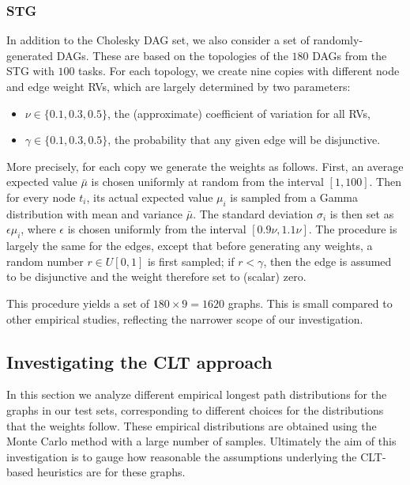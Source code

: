 \documentclass[12pt]{article}
\begin{document}
\subsubsection{STG}
\label{subsubsect.stg}

In addition to the Cholesky DAG set, we also consider a set of randomly-generated DAGs. These are based on the topologies of the $180$ DAGs from the STG with $100$ tasks. For each topology, we create nine copies with different node and edge weight RVs, which are largely determined by two parameters:
\begin{itemize}
\item $\nu \in \{ 0.1, 0.3, 0.5 \}$, the (approximate) coefficient of variation for all RVs,
  \item $\gamma \in \{ 0.1, 0.3, 0.5 \}$, the probability that any given edge will be disjunctive.
  \end{itemize}
  More precisely, for each copy we generate the weights as follows. First, an average expected value $\bar{\mu}$ is chosen uniformly at random from the interval $[1, 100]$. Then for every node $t_i$, its actual expected value $\mu_i$ is sampled from a Gamma distribution with mean and variance $\bar{\mu}$. The standard deviation $\sigma_i$ is then set as $\epsilon \mu_i$, where $\epsilon$ is chosen uniformly from the interval $[0.9\nu, 1.1\nu]$. The procedure is largely the same for the edges, except that before generating any weights, a random number $r \in U[0, 1]$ is first sampled; if $r < \gamma$, then the edge is assumed to be disjunctive and the weight therefore set to (scalar) zero.

  This procedure yields a set of $180 \times 9 = 1620$ graphs. This is small compared to other empirical studies, reflecting the narrower scope of our investigation.

\subsection{Investigating the CLT approach}
\label{subsect.empirical_distribution}

In this section we analyze different empirical longest path distributions for the graphs in our test sets, corresponding to different choices for the distributions that the weights follow. These empirical distributions are obtained using the Monte Carlo method with a large number of samples. Ultimately the aim of this investigation is to gauge how reasonable the assumptions underlying the CLT-based heuristics are for these graphs.   
\end{document}
